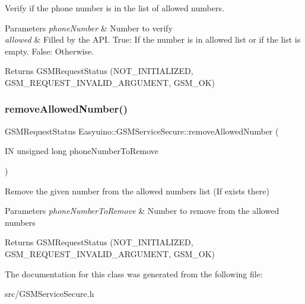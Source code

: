 Verify if the phone number is in the list of allowed numbers. 


\begin{DoxyParams}{Parameters}
{\em phone\+Number} & Number to verify \\
\hline
{\em allowed} & Filled by the A\+PI. True\+: If the number is in allowed list or if the list is empty. False\+: Otherwise. \\
\hline
\end{DoxyParams}
\begin{DoxyReturn}{Returns}
G\+S\+M\+Request\+Status (N\+O\+T\+\_\+\+I\+N\+I\+T\+I\+A\+L\+I\+Z\+ED, G\+S\+M\+\_\+\+R\+E\+Q\+U\+E\+S\+T\+\_\+\+I\+N\+V\+A\+L\+I\+D\+\_\+\+A\+R\+G\+U\+M\+E\+NT, G\+S\+M\+\_\+\+OK) 
\end{DoxyReturn}
\mbox{\label{class_easyuino_1_1_g_s_m_service_secure_a1ad4988fa2dcc0ba8f87c70cf71edf29}} 
\subsubsection{\texorpdfstring{remove\+Allowed\+Number()}{removeAllowedNumber()}}
{\footnotesize\ttfamily G\+S\+M\+Request\+Status Easyuino\+::\+G\+S\+M\+Service\+Secure\+::remove\+Allowed\+Number (\begin{DoxyParamCaption}\item[{IN unsigned long}]{phone\+Number\+To\+Remove }\end{DoxyParamCaption})}



Remove the given number from the allowed numbers list (If exists there) 


\begin{DoxyParams}{Parameters}
{\em phone\+Number\+To\+Remove} & Number to remove from the allowed numbers \\
\hline
\end{DoxyParams}
\begin{DoxyReturn}{Returns}
G\+S\+M\+Request\+Status (N\+O\+T\+\_\+\+I\+N\+I\+T\+I\+A\+L\+I\+Z\+ED, G\+S\+M\+\_\+\+R\+E\+Q\+U\+E\+S\+T\+\_\+\+I\+N\+V\+A\+L\+I\+D\+\_\+\+A\+R\+G\+U\+M\+E\+NT, G\+S\+M\+\_\+\+OK) 
\end{DoxyReturn}


The documentation for this class was generated from the following file\+:\begin{DoxyCompactItemize}
\item 
src/G\+S\+M\+Service\+Secure.\+h\end{DoxyCompactItemize}
